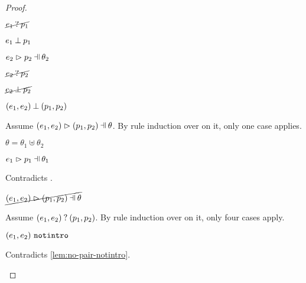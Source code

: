 \begin{proof}
\begin{byCases}
\begin{byCases}
\begin{byCases}
\begin{pfsteps*}
            \item $\cancel{e_1 \mathbin{?} p_1}$  
            \item $e_1 \mathbin{\bot} p_1$  
            \item $\hpatmatch{e_2}{p_2}{\theta_2}$  
            \item $\cancel{e_2 \mathbin{?} p_2}$  
            \item $\cancel{e_2 \mathbin{\bot} p_2}$  
            \item $(e_1 , e_2) \mathbin{\bot} (p_1 , p_2)$ 
            \end{pfsteps*}
            Assume $\hpatmatch{\hpair{e_1}{e_2}}{\hpair{p_1}{p_2}}{\theta}$. By rule induction over  on it, only one case applies.
            \begin{byCases}
            \item[\text{(\ref{rule:MPair})}]
                \begin{pfsteps*}
                \item $\theta=\theta_1\uplus\theta_2$
                \item $\hpatmatch{e_1}{p_1}{\theta_1}$ 
                \end{pfsteps*}
                Contradicts .
            \end{byCases}
            \begin{pfsteps*}
            \item $\cancel{\hpatmatch{\hpair{e_1}{e_2}}{\hpair{p_1}{p_2}}{\theta}}$ 
            \end{pfsteps*}
            Assume $(e_1 , e_2) \mathbin{?} (p_1 , p_2)$. By rule induction over  on it, only four cases apply.
            \begin{byCases}
            \item[\text{(\ref{rule:MMNotIntro})}]
                \begin{pfsteps*}
                \item $(e_1 , e_2) ~\mathtt{notintro}$ 
                \end{pfsteps*}
                Contradicts \autoref{lem:no-pair-notintro}.

\end{byCases}
\end{byCases}
\end{byCases}
\end{byCases}
\end{proof}
